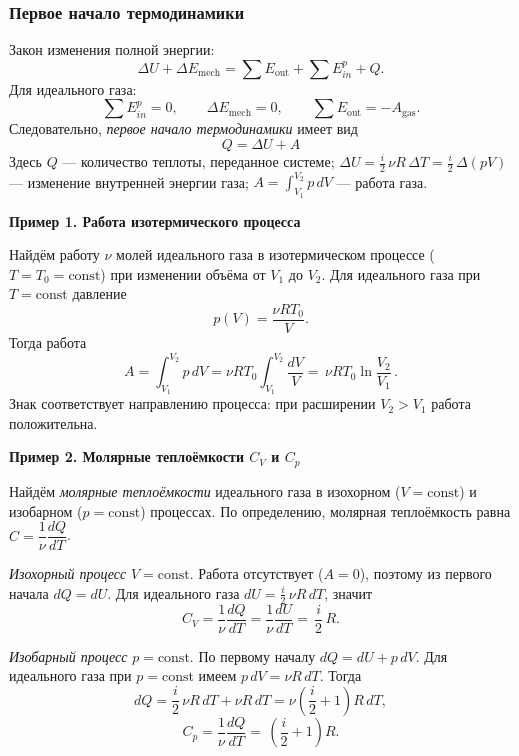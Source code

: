 \documentclass[12pt, a4paper]{article}%
\begin{document}
\subsubsection*{Первое начало термодинамики}
Закон изменения полной энергии:
\[
\Delta U+\Delta E_{\text{mech}}=\sum E_{\text{out}}+\sum E_{in}^{p}+Q.
\]
Для идеального газа:
\[
\sum E_{in}^{p}=0,\qquad \Delta E_{\text{mech}}=0,\qquad \sum E_{\text{out}}=-A_{\text{gas}}.
\]
Следовательно, \textit{первое начало термодинамики} имеет вид
\[
\boxed{\ Q=\Delta U+A\ }
\]
Здесь $Q$ — количество теплоты, переданное системе; $\Delta U=\tfrac{i}{2}\,\nu R\,\Delta T=\tfrac{i}{2}\,\Delta(pV)$ — изменение внутренней энергии газа; $A=\displaystyle\int_{V_1}^{V_2} p\,dV$ — работа газа.

\textbf{Пример 1. Работа изотермического процесса}

Найдём работу $\nu$ молей идеального газа в изотермическом процессе ($T=T_0=\text{const}$) при изменении объёма от $V_1$ до $V_2$.
Для идеального газа при $T=\text{const}$ давление
\[
p(V)=\frac{\nu R T_0}{V}.
\]
Тогда работа
\[
A=\int_{V_1}^{V_2} p\,dV=\nu R T_0\int_{V_1}^{V_2}\frac{dV}{V}
=\,\nu R T_0 \ln\frac{V_2}{V_1}\,.
\]
Знак соответствует направлению процесса: при расширении $V_2>V_1$ работа положительна.

\textbf{Пример 2. Молярные теплоёмкости $C_V$ и $C_p$}

Найдём \textit{молярные теплоёмкости} идеального газа в изохорном ($V=\text{const}$) и изобарном ($p=\text{const}$) процессах.
По определению, молярная теплоёмкость равна $C=\dfrac{1}{\nu}\dfrac{dQ}{dT}$.

\emph{Изохорный процесс} $V=\text{const}$. Работа отсутствует ($A=0$), поэтому из первого начала $dQ=dU$. Для идеального газа $dU=\tfrac{i}{2}\,\nu R\,dT$, значит
\[
C_V=\frac{1}{\nu}\frac{dQ}{dT}=\frac{1}{\nu}\frac{dU}{dT}
=\,\frac{i}{2}\,R.
\]

\emph{Изобарный процесс} $p=\text{const}$. По первому началу $dQ=dU+p\,dV$. Для идеального газа при $p=\text{const}$ имеем $p\,dV=\nu R\,dT$. Тогда
\[
dQ=\frac{i}{2}\,\nu R\,dT+\nu R\,dT=\nu\left(\frac{i}{2}+1\right)R\,dT,
\]
\[
C_p=\frac{1}{\nu}\frac{dQ}{dT}
=\,\left(\frac{i}{2}+1\right)R.
\]
\end{document}
